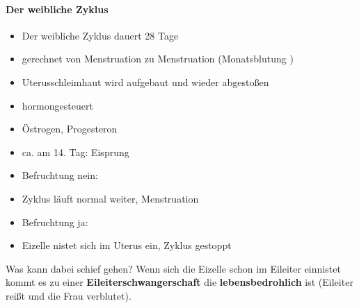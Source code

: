 \documentclass{article}
\newcommand\gEs[1]{\textbf{\textcolor[rgb]{0.0,0.0,0.5019608}{#1}}}
\newcommand\gEs[1]{\textbf{\textcolor[rgb]{0.0,0.0,0.5019608}{#1}}}
\begin{document}
\paragraph{Der weibliche Zyklus}
\begin{itemize}
\item {\mdseries
Der weibliche Zyklus dauert 28 Tage}

\item {\mdseries
gerechnet von Menstruation zu Menstruation  (Monatsblutung )}

\item {\mdseries
Uterusschleimhaut wird aufgebaut und wieder abgesto{\ss}en}

\item {\mdseries
hormongesteuert}

\end{itemize}
\begin{itemize}
\item {\mdseries
\"Ostrogen, Progesteron}

\end{itemize}
\begin{itemize}
\item {\mdseries
ca. am 14. Tag: Eisprung}

\item {\mdseries
Befruchtung nein: }

\end{itemize}
\begin{itemize}
\item {\mdseries
Zyklus l\"auft normal weiter, Menstruation}

\end{itemize}
\begin{itemize}
\item {\mdseries
Befruchtung ja:}

\end{itemize}
\begin{itemize}
\item {\mdseries
Eizelle nistet sich im Uterus ein, Zyklus gestoppt}

\end{itemize}
{\mdseries
Was kann dabei schief gehen? Wenn sich die Eizelle schon im Ei\-leiter
einnistet kommt es zu einer
\gEs{Eileiter\-schwanger\-schaft}
die \gEs{lebens\-bedrohlich} ist (Eileiter rei{\ss}t
und die Frau verblutet).}
\end{document}
